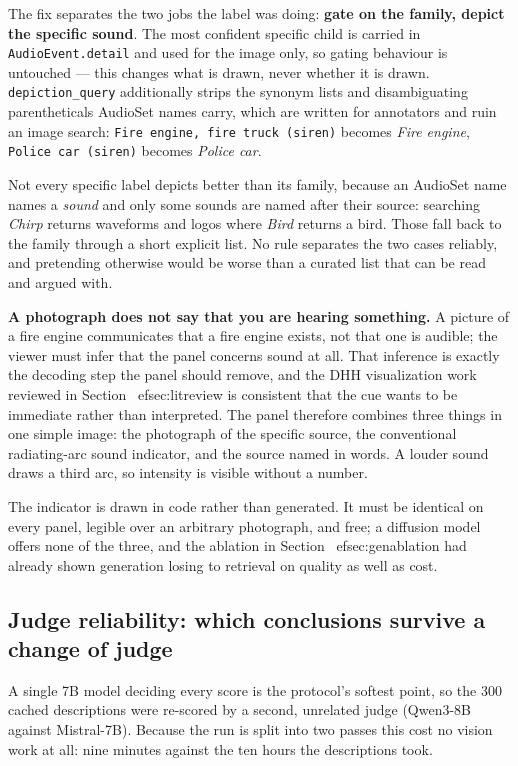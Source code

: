\documentclass[11pt,a4paper]{article}
\begin{document}
The fix separates the two jobs the label was doing: \textbf{gate on the family, depict the specific
sound}. The most confident specific child is carried in \texttt{AudioEvent.detail} and used for the
image only, so gating behaviour is untouched --- this changes what is drawn, never whether it is
drawn. \texttt{depiction\_query} additionally strips the synonym lists and disambiguating
parentheticals AudioSet names carry, which are written for annotators and ruin an image search:
\texttt{Fire engine, fire truck (siren)} becomes \emph{Fire engine}, \texttt{Police car (siren)}
becomes \emph{Police car}.

Not every specific label depicts better than its family, because an AudioSet name names a
\emph{sound} and only some sounds are named after their source: searching \emph{Chirp} returns
waveforms and logos where \emph{Bird} returns a bird. Those fall back to the family through a short
explicit list. No rule separates the two cases reliably, and pretending otherwise would be worse than
a curated list that can be read and argued with.

\textbf{A photograph does not say that you are hearing something.} A picture of a fire engine
communicates that a fire engine exists, not that one is audible; the viewer must infer that the panel
concerns sound at all. That inference is exactly the decoding step the panel should remove, and the
DHH visualization work reviewed in Section~
ef{sec:litreview} is consistent that the cue wants to be
immediate rather than interpreted. The panel therefore combines three things in one simple image: the
photograph of the specific source, the conventional radiating-arc sound indicator, and the source
named in words. A louder sound draws a third arc, so intensity is visible without a number.

The indicator is drawn in code rather than generated. It must be identical on every panel, legible
over an arbitrary photograph, and free; a diffusion model offers none of the three, and the ablation
in Section~
ef{sec:genablation} had already shown generation losing to retrieval on quality as well
as cost.

\subsection{Judge reliability: which conclusions survive a change of judge}\label{sec:judgerel}
A single 7B model deciding every score is the protocol's softest point, so the 300 cached
descriptions were re-scored by a second, unrelated judge (Qwen3-8B against Mistral-7B). Because the
run is split into two passes this cost no vision work at all: nine minutes against the ten hours the
descriptions took.
\end{document}
